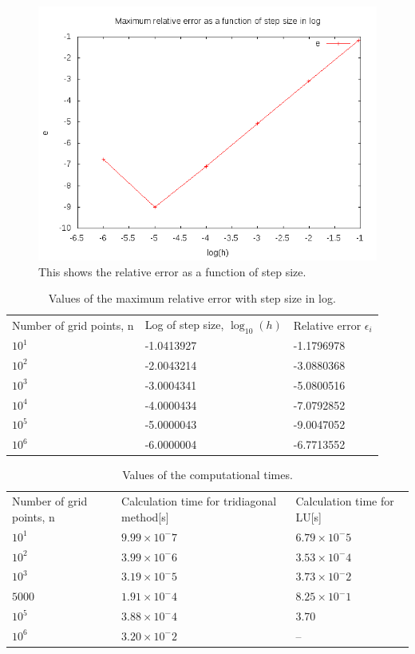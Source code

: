 \documentclass[11pt,a4wide]{article}
\begin{document}
\begin{figure}[H]
\centering
\includegraphics[width=120mm]{log.png}
\caption{This shows the relative error as a function of step size. \label{overflow}}
\end{figure}


\begin{table}[H]
\centering
\label{my-label}
\begin{tabular}{|l|l|l|}
 \cline{1-3}
 Number of grid points, n&  Log of step size, $\log_{10}(h)$ &  Relative error $\epsilon_i$   \\ \cline{1-3}
 $10^1$&  -1.0413927&    -1.1796978\\ \cline{1-3}
 $10^2$&  -2.0043214&    -3.0880368\\ \cline{1-3}
 $10^3$&  -3.0004341&     -5.0800516\\ \cline{1-3}
 $10^4$&  -4.0000434&    -7.0792852\\ \cline{1-3}
 $10^5$&  -5.0000043&    -9.0047052\\ \cline{1-3}
 $10^6$&  -6.0000004&     -6.7713552\\ \cline{1-3}
\end{tabular}
\caption{Values of the maximum relative error with step size in log. }
\end{table}

\begin{table}[H]
\centering
\label{my-label}
\begin{tabular}{|l|l|l|}
 \cline{1-3}
 Number of grid points, n&  Calculation time for tridiagonal method[s]&  Calculation time for LU[s]  \\ \cline{1-3}
 $10^1$&  $9.99\times10^-7$&   $6.79\times10^-5$\\ \cline{1-3}
 $10^2$&  $3.99\times10^-6$&   $3.53\times10^-4$\\ \cline{1-3}
 $10^3$&  $3.19\times10^-5$&   $3.73\times10^-2$\\ \cline{1-3}
 $5000$&  $1.91\times10^-4$&   $8.25\times10^-1$\\ \cline{1-3}
 $10^5$&  $3.88\times10^-4$&    3.70\\ \cline{1-3}
 $10^6$&  $3.20\times10^-2$&     --\\ \cline{1-3}
\end{tabular}
\caption{Values of the computational times.}
\end{table}
\end{document}
